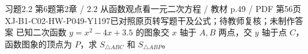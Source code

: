 \par\noindent\begin{minipage}{\linewidth}
\begin{bankitem}{习题2.2 第6题}{第2章 / 2.2 从函数观点看一元二次方程 / 教材 p.49 / PDF 第56页}{XJ-B1-C02-HW-P049-Y1197}{已对照原页转写题干及公式；待教师复核；未制作答案}
已知二次函数 $y=x^2-4x+3.5$ 的图象交 $x$ 轴于 $A,B$ 两点，交 $y$ 轴于点 $C$，函数图象的顶点为 $P$，求 $S_{\triangle ABC}$ 和 $S_{\triangle ABP}$。
\end{bankitem}
\end{minipage}\par\medskip
